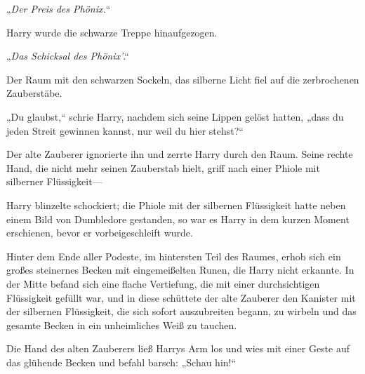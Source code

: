 „\emph{Der Preis des Phönix.}“

Harry wurde die schwarze Treppe hinaufgezogen.

„\emph{Das Schicksal des Phönix'}.“

Der Raum mit den schwarzen Sockeln, das silberne Licht fiel auf die zerbrochenen Zauberstäbe.

„Du glaubst,“ schrie Harry, nachdem sich seine Lippen gelöst hatten, „dass du jeden Streit gewinnen kannst, nur weil du hier stehst?“

Der alte Zauberer ignorierte ihn und zerrte Harry durch den Raum. Seine rechte Hand, die nicht mehr seinen Zauberstab hielt, griff nach einer Phiole mit silberner Flüssigkeit—

Harry blinzelte schockiert; die Phiole mit der silbernen Flüssigkeit hatte neben einem Bild von Dumbledore gestanden, so war es Harry in dem kurzen Moment erschienen, bevor er vorbeigeschleift wurde.

Hinter dem Ende aller Podeste, im hintersten Teil des Raumes, erhob sich ein großes steinernes Becken mit eingemeißelten Runen, die Harry nicht erkannte. In der Mitte befand sich eine flache Vertiefung, die mit einer durchsichtigen Flüssigkeit gefüllt war, und in diese schüttete der alte Zauberer den Kanister mit der silbernen Flüssigkeit, die sich sofort auszubreiten begann, zu wirbeln und das gesamte Becken in ein unheimliches Weiß zu tauchen.

Die Hand des alten Zauberers ließ Harrys Arm los und wies mit einer Geste auf das glühende Becken und befahl barsch: „Schau hin!“

